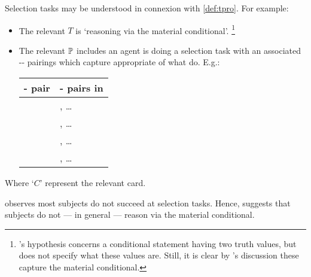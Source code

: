 \begin{note}
  Selection tasks may be understood in connexion with \autoref{def:tpro}.
  For example:
  \begin{itemize}
  \item
    The relevant \tocN{} \(T\) is `reasoning via the material conditional'.%
    \footnote{
      \citeauthor{Wason:1966aa}'s hypothesis concerns a conditional statement having two truth values, but does not specify what these values are.
      Still, it is clear by \citeauthor{Wason:1966aa}'s discussion these capture the material conditional.
    }
  \item
    The relevant \tpro{} \(\mathbb{P}\) includes  an agent is doing a selection task with an associated -- pairings which capture appropriate  of what do.
    E.g.:
    \begin{center}
      \begin{tabular}{R{.40\textwidth} L{.40\textwidth}}
        - pair & - pairs in  \\
        \hline
         & , \dots \\
         & , \dots \\
         & , \dots \\
         & , \dots \\
      \end{tabular}
    \end{center}
  \end{itemize}
  Where `\(C\)' represent the relevant card.
\end{note}


\begin{note}
  \citeauthor{Wason:1966aa} observes most subjects do not succeed at selection tasks.
  Hence, \citeauthor{Wason:1966aa} suggests that subjects do not --- in general --- reason via the material conditional.
\end{note}


